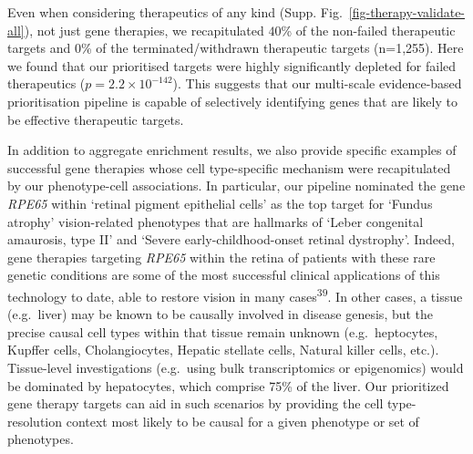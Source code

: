 \documentclass[
]{article}
\begin{document}
Even when considering therapeutics of any kind (Supp.
Fig.~\ref{fig-therapy-validate-all}), not just gene therapies, we
recapitulated \(40\)\% of the non-failed therapeutic targets and 0\% of
the terminated/withdrawn therapeutic targets (n=1,255). Here we found
that our prioritised targets were highly significantly depleted for
failed therapeutics (\(p=\)\(2.2 \times 10^{-142}\)). This suggests that
our multi-scale evidence-based prioritisation pipeline is capable of
selectively identifying genes that are likely to be effective
therapeutic targets.

In addition to aggregate enrichment results, we also provide specific
examples of successful gene therapies whose cell type-specific mechanism
were recapitulated by our phenotype-cell associations. In particular,
our pipeline nominated the gene \emph{RPE65} within `retinal pigment
epithelial cells' as the top target for `Fundus atrophy' vision-related
phenotypes that are hallmarks of `Leber congenital amaurosis, type II'
and `Severe early-childhood-onset retinal dystrophy'. Indeed, gene
therapies targeting \emph{RPE65} within the retina of patients with
these rare genetic conditions are some of the most successful clinical
applications of this technology to date, able to restore vision in many
cases\textsuperscript{39}. In other cases, a tissue (e.g.~liver) may be
known to be causally involved in disease genesis, but the precise causal
cell types within that tissue remain unknown (e.g.~heptocytes, Kupffer
cells, Cholangiocytes, Hepatic stellate cells, Natural killer cells,
etc.). Tissue-level investigations (e.g.~using bulk transcriptomics or
epigenomics) would be dominated by hepatocytes, which comprise 75\% of
the liver. Our prioritized gene therapy targets can aid in such
scenarios by providing the cell type-resolution context most likely to
be causal for a given phenotype or set of phenotypes.
\end{document}
